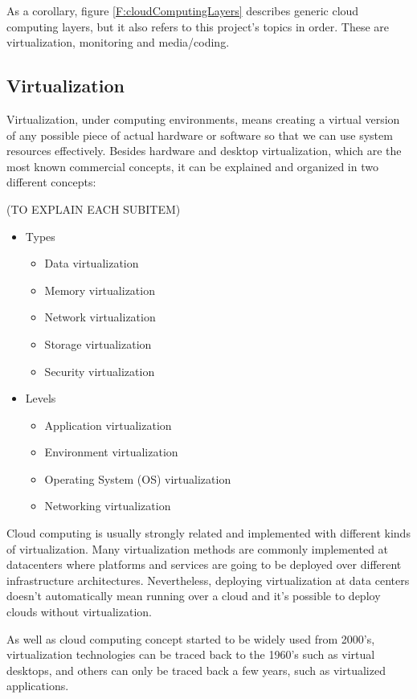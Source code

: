 As a corollary, figure \ref{F:cloudComputingLayers} describes generic cloud computing layers, but it also refers to this project's topics in order. These are virtualization, monitoring and media/coding.

\subsection{Virtualization}

Virtualization, under computing environments, means creating a virtual version of any possible piece of actual hardware or software so that we can use system resources effectively. Besides hardware and desktop virtualization, which are the most known commercial concepts, it can be explained and organized in two different concepts:

(TO EXPLAIN EACH SUBITEM)
\begin{itemize}
\item Types
\begin{itemize}
\item Data virtualization
\item Memory virtualization
\item Network virtualization
\item Storage virtualization
\item Security virtualization
\end{itemize}
\item Levels
\begin{itemize}
\item Application virtualization
\item Environment virtualization
\item Operating System (OS) virtualization
\item Networking virtualization
\end{itemize}
\end{itemize}

Cloud computing is usually strongly related and implemented with different kinds of virtualization. Many virtualization methods are commonly implemented at datacenters where platforms and services are going to be deployed over different infrastructure architectures. Nevertheless, deploying virtualization at data centers doesn’t automatically mean running over a cloud and it’s possible to deploy clouds without virtualization.

As well as cloud computing concept started to be widely used from 2000's, virtualization  technologies can be traced back to the 1960’s such as virtual desktops, and others can only be traced back a few years, such as virtualized applications.

